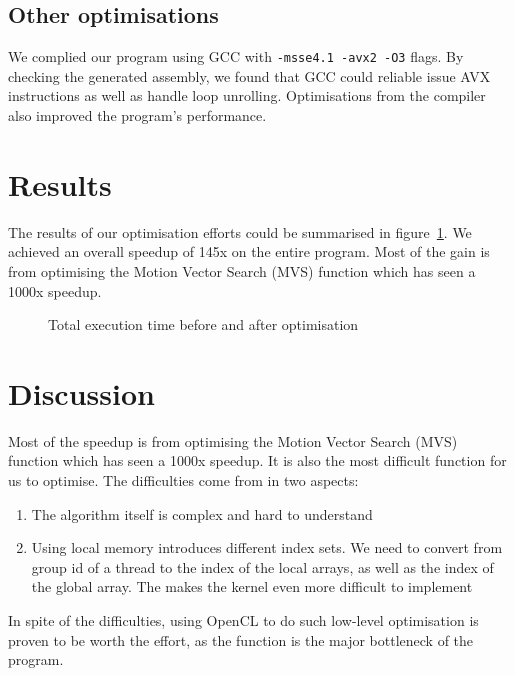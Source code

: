 \documentclass[a4paper]{article}
\begin{document}
\subsection{Other optimisations}
We complied our program using GCC with \verb|-msse4.1 -avx2 -O3|
flags. By checking the generated assembly, we found that GCC could
reliable issue AVX instructions as well as handle loop unrolling.
Optimisations from the compiler also improved the program's
performance.

\section{Results}
The results of our optimisation efforts could be summarised in
figure~\ref{fig:before_after_bar}. We achieved an overall speedup of
145x on the entire program. Most of the gain is from optimising the
Motion Vector Search (MVS) function which has seen a 1000x speedup.
\begin{figure}[h]
  \centering
  \caption{Total execution time before and after optimisation}
  \label{fig:before_after_bar}
\end{figure}

\section{Discussion}
Most of the speedup is from optimising the Motion Vector Search (MVS)
function which has seen a 1000x speedup. It is also the most difficult
function for us to optimise. The difficulties come from in two
aspects:
\begin{enumerate}
\item The algorithm itself is complex and hard to understand
\item Using local memory introduces different index sets. We need to
  convert from group id of a thread to the index of the local arrays,
  as well as the index of the global array. The makes the kernel even
  more difficult to implement
\end{enumerate}

In spite of the difficulties, using OpenCL to do such low-level
optimisation is proven to be worth the effort, as the function is the
major bottleneck of the program.
\end{document}
